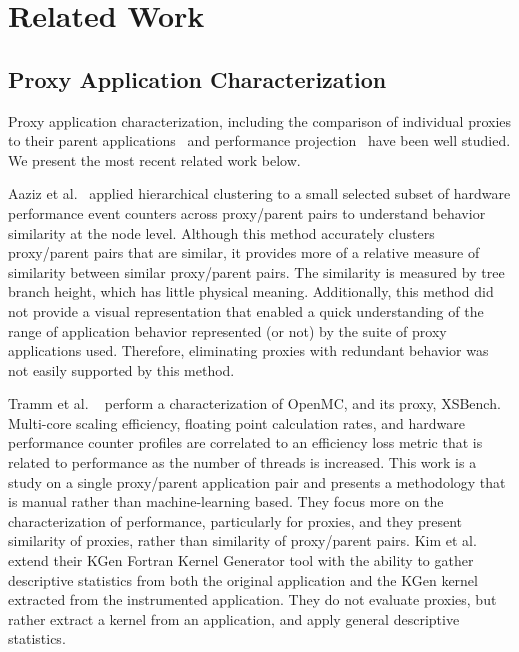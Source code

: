 \section{Related Work}
\label{sec:relatedWork}
\subsection{Proxy Application Characterization}
Proxy application characterization, including the comparison of individual proxies to their parent applications~\cite{BARRETT2015107, Islam:2016:MLF:3014904.3014966, 8049024, CPE:CPE3587} and performance projection~\cite{barrett2012navigating, sharkawi2009performance,8049025} have been well studied. We present the most recent related work below. 

Aaziz et al.~\cite{8514880} applied hierarchical clustering to a small selected subset of hardware performance event counters across proxy/parent pairs to understand behavior similarity at the node level. Although this method accurately clusters proxy/parent pairs that are similar, it provides more of a relative measure of similarity between similar proxy/parent pairs.  The similarity is measured by tree branch height, which has little physical
meaning. Additionally, this method did not provide a visual representation that enabled a quick understanding of the range of application behavior represented (or not) by the suite of proxy applications used. Therefore, eliminating proxies with redundant behavior was not easily supported by this method.

Tramm et al. ~\cite{XSBench} perform a characterization of OpenMC, and its proxy, XSBench. Multi-core scaling efficiency, floating point calculation rates, and hardware performance counter profiles are correlated to an efficiency loss metric that is related to performance as the number of threads is increased.  This work is a study on a single proxy/parent application pair and presents a methodology that is manual rather than machine-learning based. They focus more on the characterization of performance, particularly for proxies, and they present similarity of proxies, rather than similarity of proxy/parent pairs.  Kim et al.~\cite{8049024} extend their KGen Fortran Kernel Generator tool with the ability to gather descriptive statistics from both the original application and the KGen kernel extracted from the instrumented application. They do not evaluate proxies, but rather extract a kernel from an application, and apply general descriptive statistics.

